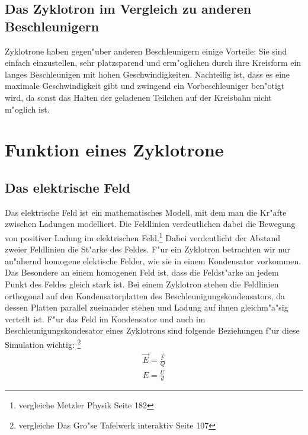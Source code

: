 \documentclass[14pt, a4paper]{report}
\begin{document}
\section{Das Zyklotron im Vergleich zu anderen Beschleunigern}
Zyklotrone haben gegen"uber anderen Beschleunigern einige Vorteile: Sie sind einfach
einzustellen, sehr  platzsparend und erm"oglichen durch ihre Kreisform  ein langes
Beschleunigen mit hohen Geschwindigkeiten. Nachteilig ist, dass es eine maximale
Geschwindigkeit gibt und zwingend ein Vorbeschleuniger ben"otigt wird, da sonst das 
Halten der geladenen Teilchen auf der Kreisbahn nicht m"oglich ist. 

\chapter{Funktion eines Zyklotrone}
\section{Das elektrische Feld}
Das elektrische Feld ist ein mathematisches Modell, mit dem man die Kr"afte zwischen
Ladungen modelliert. Die Feldlinien verdeutlichen dabei die Bewegung von positiver 
Ladung im elektrischen Feld.\footnote{vergleiche Metzler Physik Seite 182}
Dabei verdeutlicht der Abstand zweier
Feldlinien die St"arke des Feldes. F"ur ein Zyklotron betrachten wir nur an"ahernd
homogene elektische Felder, wie sie in einem Kondensator vorkommen. Das Besondere an 
einem homogenen Feld ist, dass die Feldst"arke an jedem Punkt des Feldes gleich stark 
ist. Bei einem Zyklotron stehen die Feldlinien orthogonal auf den Kondensatorplatten
des Beschleunigungskondensators, da dessen Platten parallel zueinander stehen und Ladung
auf ihnen gleichm"a"sig verteilt ist.
F"ur das Feld im Kondensator und auch im Beschleunigungskondesator eines Zyklotrons
sind folgende Beziehungen f"ur diese Simulation wichtig:
\footnote{vergleiche Das Gro"se Tafelwerk interaktiv Seite 107}
\begin{eqnarray} \label{E-Feld-Gleichungen}
\vec{E} = \frac{\vec{F}}{Q} \\
E = \frac{U}{d}
\end{eqnarray}
\end{document}

